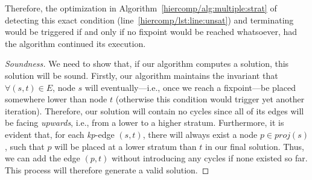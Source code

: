 \noindent
Therefore, the optimization in
Algorithm~\ref{hiercomp/alg:multiple:strat} of detecting this exact
condition (line~\ref{hiercomp/lst:line:unsat}) and terminating would
be triggered if and only if no fixpoint would be reached whatsoever,
had the algorithm continued its execution.

\begin{proof}[Soundness]
  We need to show that, if our algorithm computes a solution, this
  solution will be sound. Firstly, our algorithm maintains the
  invariant that $\forall (s,t) \in E$, node $s$ will
  eventually---i.e., once we reach a fixpoint---be placed somewhere lower
  than node $t$ (otherwise this condition would trigger yet another
  iteration). Therefore, our solution will contain no cycles since all
  of its edges will be facing \emph{upwards}, i.e., from a lower to a
  higher stratum. Furthermore, it is evident that, for each
  \emph{kp}-edge $(s,t)$, there will always exist a node $p \in
  \textit{proj}(s)$, such that $p$ will be placed at a lower stratum than $t$
  in our final solution. Thus, we can add the edge $(p,t)$ without
  introducing any cycles if none existed so far. This process will
  therefore generate a valid solution.
\end{proof}

